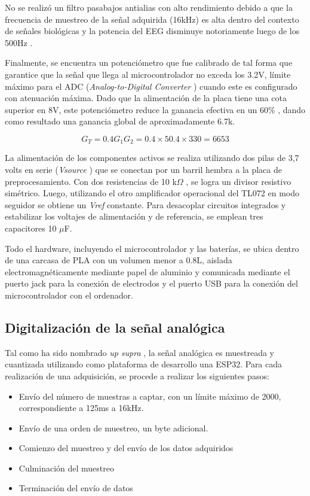 No se realizó un filtro pasabajos antialias con alto rendimiento debido a que la frecuencia de muestreo de la señal
adquirida (16kHz) es alta dentro del contexto de señales biológicas y la potencia del EEG disminuye notoriamente luego
de los 500Hz \cite{encyclopedia-scholarly-community}.

Finalmente, se encuentra un potenciómetro que fue calibrado de tal forma que garantice que la señal que llega al
microcontrolador no exceda los 3.2V, límite máximo para el ADC (\textit{Analog-to-Digital Converter}
) cuando este es configurado con atenuación máxima. Dado que la alimentación de la placa tiene una cota superior en 8V,
este potenciómetro reduce la ganancia efectiva en un 60\%
, dando como resultado una ganancia global de aproximadamente 6.7k.

\begin{equation}
    G_T = 0.4 G_1 G_2 = 0.4 \times 50.4 \times 330 = 6653
\end{equation}

La alimentación de los componentes activos se realiza utilizando dos pilas de 3,7 volts en serie (\textit{Vsource}
) que se conectan por un barril hembra a la placa de preprocesamiento. Con dos resistencias de 10 k$\Omega$
, se logra un divisor resistivo simétrico. Luego, utilizando el otro amplificador operacional del TL072 en modo seguidor
se obtiene un \textit{Vref}
constante. Para desacoplar circuitos integrados y estabilizar los voltajes de alimentación y de referencia, se emplean
tres capacitores 10 $\mu$F.

Todo el hardware, incluyendo el microcontrolador y las baterías, se ubica dentro de una carcasa de PLA con un volumen
menor a 0.8L, aislada electromagnéticamente mediante papel de aluminio y comunicada mediante el puerto jack para la
conexión de electrodos y el puerto USB para la conexión del microcontrolador con el ordenador.

\subsection{Digitalización de la señal analógica}
Tal como ha sido nombrado \textit{up supra}
, la señal analógica es muestreada y cuantizada utilizando como plataforma de desarrollo una ESP32. Para cada
realización de una adquisición, se procede a realizar los siguientes pasos:

\begin{itemize}
    \item Envío del número de muestras a captar, con un límite máximo de 2000, correspondiente a 125ms a 16kHz.
    \item Envío de una orden de muestreo, un byte adicional.
    \item Comienzo del muestreo y del envío de los datos adquiridos
    \item Culminación del muestreo
    \item Terminación del envío de datos
\end{itemize}

